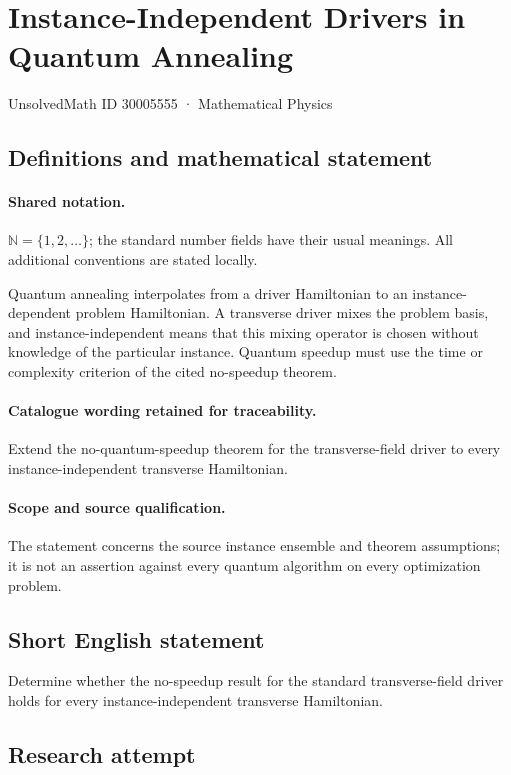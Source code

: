 \documentclass[11pt]{article}
\begin{document}
\setcounter{section}{30005554}
\section{Instance-Independent Drivers in Quantum Annealing}\label{30005555}
{\small UnsolvedMath ID 30005555 · Mathematical Physics}
\subsection{Definitions and mathematical statement}

\paragraph{Shared notation.}$\mathbb N=\{1,2,\ldots\}$; the standard number fields have their usual meanings. All additional conventions are stated locally.


Quantum annealing interpolates from a driver Hamiltonian to an instance-dependent problem Hamiltonian. A transverse driver mixes the problem basis, and instance-independent means that this mixing operator is chosen without knowledge of the particular instance. Quantum speedup must use the time or complexity criterion of the cited no-speedup theorem.

\paragraph{Catalogue wording retained for traceability.}
Extend the no-quantum-speedup theorem for the transverse-field driver to every instance-independent transverse Hamiltonian.

\paragraph{Scope and source qualification.}The statement concerns the source instance ensemble and theorem assumptions; it is not an assertion against every quantum algorithm on every optimization problem.
\subsection{Short English statement}
Determine whether the no-speedup result for the standard transverse-field driver holds for every instance-independent transverse Hamiltonian.
\subsection{Research attempt}
\end{document}
